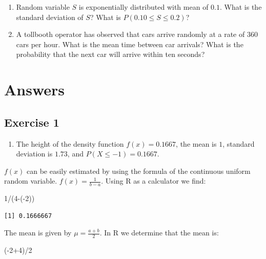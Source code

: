 \documentclass[
  letterpaper,
  DIV=11,
  numbers=noendperiod]{scrreprt}
\newenvironment{Shaded}{\begin{snugshade}}{\end{snugshade}}
\newcommand{\DecValTok}[1]{\textcolor[rgb]{0.68,0.00,0.00}{#1}}
\newcommand{\NormalTok}[1]{\textcolor[rgb]{0.00,0.23,0.31}{#1}}
\newcommand{\SpecialCharTok}[1]{\textcolor[rgb]{0.37,0.37,0.37}{#1}}
\providecommand{\tightlist}{%
  \setlength{\itemsep}{0pt}\setlength{\parskip}{0pt}}\usepackage{longtable,booktabs,array}
\begin{document}
\begin{enumerate}
\def\labelenumi{\arabic{enumi}.}
\item
  Random variable \(S\) is exponentially distributed with mean of
  \(0.1\). What is the standard deviation of \(S\)? What is
  \(P(0.10 \leq S \leq 0.2)\)?
\item
  A tollbooth operator has observed that cars arrive randomly at a rate
  of \(360\) cars per hour. What is the mean time between car arrivals?
  What is the probability that the next car will arrive within ten
  seconds?
\end{enumerate}

\hypertarget{answers-9}{%
\section{Answers}\label{answers-9}}

\hypertarget{exercise-1-19}{%
\subsection*{Exercise 1}\label{exercise-1-19}}

\begin{enumerate}
\def\labelenumi{\arabic{enumi}.}
\tightlist
\item
  The height of the density function \(f(x)=0.1667\), the mean is \(1\),
  standard deviation is \(1.73\), and \(P(X \leq -1)=0.1667\).
\end{enumerate}

\(f(x)\) can be easily estimated by using the formula of the continuous
uniform random variable. \(f(x)=\frac{1}{b-a}\). Using R as a calculator
we find:

\begin{Shaded}
\begin{Highlighting}[numbers=left,,]
\DecValTok{1}\SpecialCharTok{/}\NormalTok{(}\DecValTok{4}\SpecialCharTok{{-}}\NormalTok{(}\SpecialCharTok{{-}}\DecValTok{2}\NormalTok{))}
\end{Highlighting}
\end{Shaded}

\begin{verbatim}
[1] 0.1666667
\end{verbatim}

The mean is given by \(\mu = \frac{a+b}{2}\). In R we determine that the
mean is:

\begin{Shaded}
\begin{Highlighting}[numbers=left,,]
\NormalTok{(}\SpecialCharTok{{-}}\DecValTok{2}\SpecialCharTok{+}\DecValTok{4}\NormalTok{)}\SpecialCharTok{/}\DecValTok{2}
\end{Highlighting}
\end{Shaded}
\end{document}
